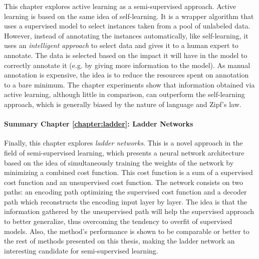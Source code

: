 This chapter explores active learning as a semi-supervised approach. Active
learning is based on the same idea of self-learning. It is a wrapper algorithm
that uses a supervised model to select instances taken from a pool of unlabeled
data. However, instead of annotating the instances automatically, like
self-learning, it uses an {\em intelligent approach} to select data and gives
it to a human expert to annotate. The data is selected based on the impact it
will have in the model to correctly annotate it (e.g. by giving more
information to the model). As manual annotation is expensive, the idea is to
reduce the resources spent on annotation to a bare minimum. The chapter
experiments show that information obtained via active learning, although little
in comparison, can outperform the self-learning approach, which is generally
biased by the nature of language and Zipf's law.

\paragraph{Summary Chapter \ref{chapter:ladder}: Ladder Networks}

Finally, this chapter explores {\em ladder networks}. This is a novel approach
in the field of semi-supervised learning, which presents a neural network
architecture based on the idea of simultaneously training the weights of the
network by minimizing a combined cost function. This cost function is a sum of
a supervised cost function and an unsupervised cost function. The network
consists on two paths: an encoding path optimizing the supervised cost
function and a decoder path which reconstructs the encoding input layer by
layer. The idea is that the information gathered by the unsupervised path will
help the supervised approach to better generalize, thus overcoming the tendency
to overfit of supervised models. Also, the method's performance is shown to be
comparable or better to the rest of methods presented on this thesis, making
the ladder network an interesting candidate for semi-supervised learning.
